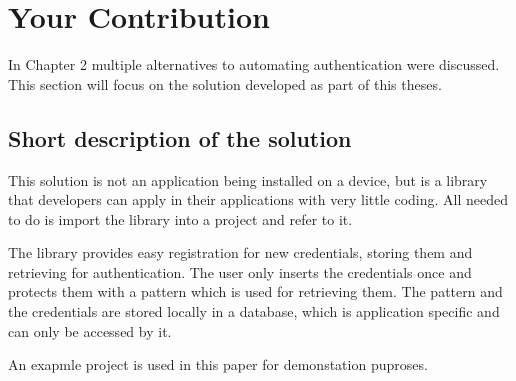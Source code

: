 
\chapter{Your Contribution} %

In Chapter 2 multiple alternatives to automating authentication were discussed. This section will focus on the solution developed as part of this theses. 



\ifpdf
    \graphicspath{{X/figures/PNG/}{X/figures/PDF/}{X/figures/}}
\else
    \graphicspath{{X/figures/EPS/}{X/figures/}}
\fi


\section{Short description of the solution}
This solution is not an application being installed on a device, but is a library that developers can apply in their applications with very little coding. All needed to do is import the library into a project and refer to it.

The library provides easy registration for new credentials, storing them and retrieving for authentication. The user only inserts the credentials once and protects them with a pattern which is used for retrieving them. The pattern and the credentials are stored locally in a database, which is application specific and can only be accessed by it. 

An exapmle project is used in this paper for demonstation puproses.

\newpage

